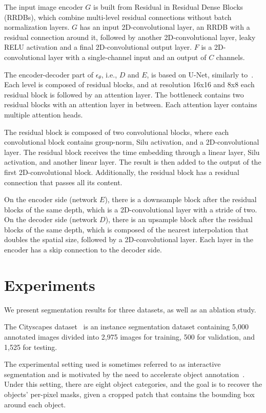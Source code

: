 \documentclass[10pt,twocolumn,letterpaper]{article}
\begin{document}
The input image encoder $G$ is built from Residual in Residual Dense Blocks~\cite{wang2018esrgan} (RRDBs), which combine multi-level residual connections without batch normalization layers. $G$ has an input 2D-convolutional layer, an RRDB with a residual connection around it, followed by another 2D-convolutional layer, leaky RELU activation and a final 2D-convolutional output layer. $F$ is a 2D-convolutional layer with a single-channel input and an output of $C$ channels.

The encoder-decoder part of $\epsilon_\theta$, i.e., $D$ and $E$, is based on U-Net, similarly to~\cite{nichol2021improved}. Each level is composed of residual blocks, and at resolution 16x16 and 8x8 each residual block is followed by an attention layer. The bottleneck contains two residual blocks with an attention layer in between. Each attention layer contains multiple attention heads.

The residual block is composed of two convolutional blocks, where each convolutional block contains group-norm, Silu activation, and a 2D-convolutional layer. The residual block receives the time embedding through a linear layer, Silu activation, and another linear layer. The result is then added to the output of the first 2D-convolutional block. Additionally, the residual block has a residual connection that passes all its content.


On the encoder side (network $E$), there is a downsample block after the residual blocks of the same depth, which is a 2D-convolutional layer with a stride of two. On the decoder side (network $D$), there is an upsample block after the residual blocks of the same depth, which is composed of the nearest interpolation that doubles the spatial size, followed by a 2D-convolutional layer. Each layer in the encoder has a skip connection to the decoder side.

\section{Experiments}
\label{sec:experiments}

We present segmentation results for three datasets, as well as an ablation study. 

 The Cityscapes dataset~\cite{Cordts2016Cityscapes} is an instance segmentation dataset containing 5,000 annotated images divided into 2,975 images for training, 500 for validation, and 1,525 for testing. 

The experimental setting used is sometimes referred to as interactive segmentation and is motivated by the need to accelerate object annotation~\cite{acuna2018efficient}. Under this setting, there are eight object categories, and the goal is to recover the objects' per-pixel masks, given a cropped patch that contains the bounding box around each object.
\end{document}
